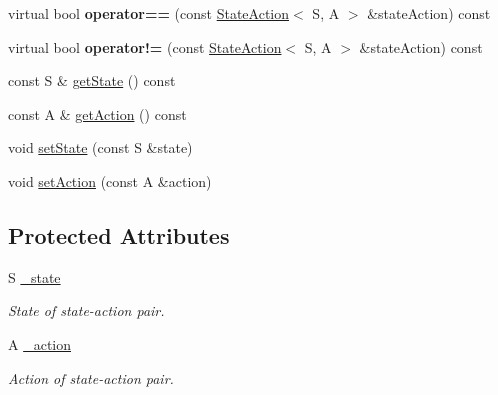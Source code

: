 \begin{DoxyCompactItemize}
\item 
\hypertarget{classAI_1_1StateAction_acb219388dc6b7a94b10ae95125b9f7b1}{virtual bool {\bfseries operator==} (const \hyperlink{classAI_1_1StateAction}{State\+Action}$<$ S, A $>$ \&state\+Action) const }\label{classAI_1_1StateAction_acb219388dc6b7a94b10ae95125b9f7b1}

\item 
\hypertarget{classAI_1_1StateAction_ad0e12e35055091f159f79a952e741f1e}{virtual bool {\bfseries operator!=} (const \hyperlink{classAI_1_1StateAction}{State\+Action}$<$ S, A $>$ \&state\+Action) const }\label{classAI_1_1StateAction_ad0e12e35055091f159f79a952e741f1e}

\item 
const S \& \hyperlink{classAI_1_1StateAction_ac9bdee11a201a7fd87071ab64b2a9743}{get\+State} () const 
\item 
const A \& \hyperlink{classAI_1_1StateAction_ae1cec3a09af9a8ca110857baa7727758}{get\+Action} () const 
\item 
void \hyperlink{classAI_1_1StateAction_a6ae04532d8d228dc4eb128c8ca223ba4}{set\+State} (const S \&state)
\item 
void \hyperlink{classAI_1_1StateAction_aa842cc33bf4d9cba87212a3a9fb94796}{set\+Action} (const A \&action)
\end{DoxyCompactItemize}
\subsection*{Protected Attributes}
\begin{DoxyCompactItemize}
\item 
\hypertarget{classAI_1_1StateAction_a0e64eecf8347c051e20e1a015ef9960a}{S \hyperlink{classAI_1_1StateAction_a0e64eecf8347c051e20e1a015ef9960a}{\+\_\+state}}\label{classAI_1_1StateAction_a0e64eecf8347c051e20e1a015ef9960a}

\begin{DoxyCompactList}\small\item\em State of state-\/action pair. \end{DoxyCompactList}\item 
\hypertarget{classAI_1_1StateAction_a951975a1853e815c68bd7400f4f1d97a}{A \hyperlink{classAI_1_1StateAction_a951975a1853e815c68bd7400f4f1d97a}{\+\_\+action}}\label{classAI_1_1StateAction_a951975a1853e815c68bd7400f4f1d97a}

\begin{DoxyCompactList}\small\item\em Action of state-\/action pair. \end{DoxyCompactList}\end{DoxyCompactItemize}


